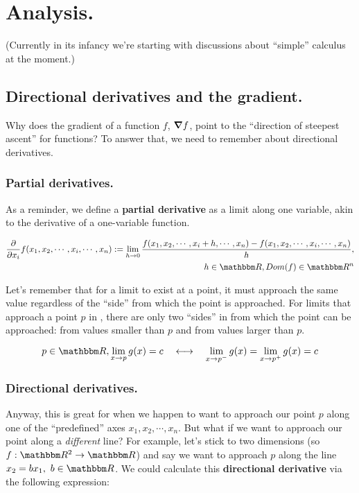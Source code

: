 \documentclass[../main/main.tex]{subfiles}
\begin{document}
\chapter{Analysis.}\label{chapter:analysis}

(Currently in its infancy \textemdash{} we're starting
with discussions about ``simple'' calculus at the moment.)

\section{Directional derivatives and the gradient.}

Why does the gradient of a function \(f\), \(\grad{f}\),
point to the ``direction of steepest ascent'' for functions?
To answer that, we need to remember 
about directional derivatives.

\subsection{Partial derivatives.}

As a reminder, we define a 
\textbf{partial derivative}
as a limit along one variable, akin to the derivative
of a one-variable function.

\[\begin{split}
  \pdv{}{x_i}f(x_1, x_2, \cdots, x_i, \cdots, x_n) \definedas \lim_{h \rightarrow 0} \frac{f(x_1, x_2, \cdots, x_i + h, \cdots, x_n) - f(x_1, x_2, \cdots, x_i, \cdots, x_n)}{h}, 
  \\
  h \in \domain{R}, Dom(f) \in \domain{R}^n
\end{split}\]

Let's remember that for a limit to exist at a point, it
must approach the same value regardless of the ``side''
from which the point is approached. For limits that approach
a point \(p\) in , 
there are only two ``sides'' in  from
which the point can be approached: from values smaller
than \(p\) and from values larger than \(p\).

\[p \in \domain{R}, \lim_{x \rightarrow p}g(x) = c 
\quad \longleftrightarrow \quad
\lim_{x \rightarrow p^-}g(x) = \lim_{x \rightarrow p^+}g(x) = c\]

\subsection{Directional derivatives.}

Anyway, this is great for when we happen to want to 
approach our point \(p\) 
along one of the ``predefined'' axes \(x_1, x_2, \cdots, x_n\).
But what if we want to approach our point along a
\emph{different} line? For example, let's stick to two
dimensions (so \(f: \domain{R}^2 \to \domain{R}\)) and say we want to approach \(p\) along the line
\(x_2 = bx_1, \ b \in \domain{R}\). We could calculate this
\textbf{directional derivative} via the following expression:
\end{document}
